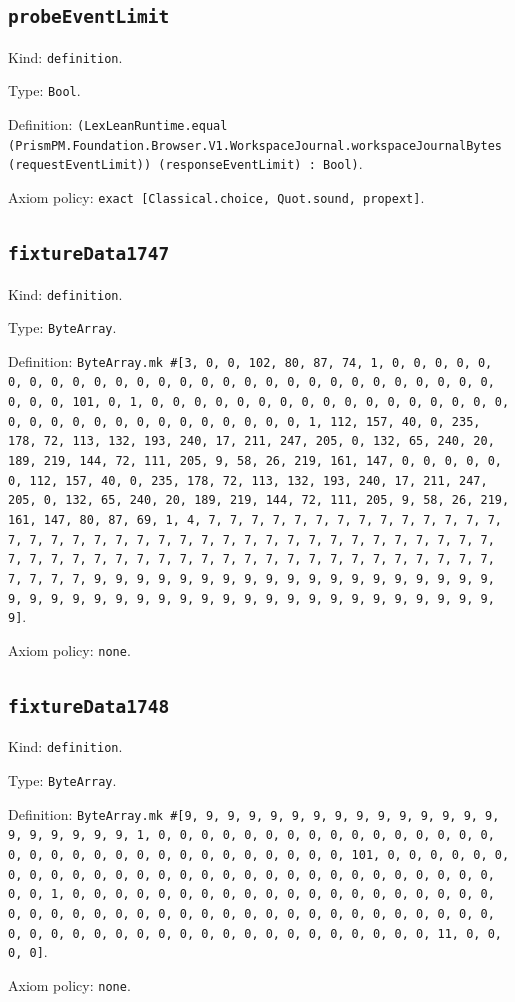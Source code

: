 \documentclass[11pt]{article}
\begin{document}
\subsection*{\texttt{probeEventLimit}}
\noindent Kind: \texttt{definition}.\par
\noindent Type: \texttt{Bool}.\par
\noindent Definition: \texttt{(LexLeanRuntime.equal (PrismPM.Foundation.Browser.V1.WorkspaceJournal.workspaceJournalBytes (requestEventLimit)) (responseEventLimit) : Bool)}.\par
\noindent Axiom policy: \texttt{exact [Classical.choice, Quot.sound, propext]}.\par
\subsection*{\texttt{fixtureData1747}}
\noindent Kind: \texttt{definition}.\par
\noindent Type: \texttt{ByteArray}.\par
\noindent Definition: \texttt{ByteArray.mk \#[3, 0, 0, 102, 80, 87, 74, 1, 0, 0, 0, 0, 0, 0, 0, 0, 0, 0, 0, 0, 0, 0, 0, 0, 0, 0, 0, 0, 0, 0, 0, 0, 0, 0, 0, 0, 0, 0, 0, 101, 0, 1, 0, 0, 0, 0, 0, 0, 0, 0, 0, 0, 0, 0, 0, 0, 0, 0, 0, 0, 0, 0, 0, 0, 0, 0, 0, 0, 0, 0, 0, 0, 0, 1, 112, 157, 40, 0, 235, 178, 72, 113, 132, 193, 240, 17, 211, 247, 205, 0, 132, 65, 240, 20, 189, 219, 144, 72, 111, 205, 9, 58, 26, 219, 161, 147, 0, 0, 0, 0, 0, 0, 112, 157, 40, 0, 235, 178, 72, 113, 132, 193, 240, 17, 211, 247, 205, 0, 132, 65, 240, 20, 189, 219, 144, 72, 111, 205, 9, 58, 26, 219, 161, 147, 80, 87, 69, 1, 4, 7, 7, 7, 7, 7, 7, 7, 7, 7, 7, 7, 7, 7, 7, 7, 7, 7, 7, 7, 7, 7, 7, 7, 7, 7, 7, 7, 7, 7, 7, 7, 7, 7, 7, 7, 7, 7, 7, 7, 7, 7, 7, 7, 7, 7, 7, 7, 7, 7, 7, 7, 7, 7, 7, 7, 7, 7, 7, 7, 7, 7, 7, 7, 7, 9, 9, 9, 9, 9, 9, 9, 9, 9, 9, 9, 9, 9, 9, 9, 9, 9, 9, 9, 9, 9, 9, 9, 9, 9, 9, 9, 9, 9, 9, 9, 9, 9, 9, 9, 9, 9, 9, 9, 9, 9, 9, 9]}.\par
\noindent Axiom policy: \texttt{none}.\par
\subsection*{\texttt{fixtureData1748}}
\noindent Kind: \texttt{definition}.\par
\noindent Type: \texttt{ByteArray}.\par
\noindent Definition: \texttt{ByteArray.mk \#[9, 9, 9, 9, 9, 9, 9, 9, 9, 9, 9, 9, 9, 9, 9, 9, 9, 9, 9, 9, 9, 1, 0, 0, 0, 0, 0, 0, 0, 0, 0, 0, 0, 0, 0, 0, 0, 0, 0, 0, 0, 0, 0, 0, 0, 0, 0, 0, 0, 0, 0, 0, 0, 0, 101, 0, 0, 0, 0, 0, 0, 0, 0, 0, 0, 0, 0, 0, 0, 0, 0, 0, 0, 0, 0, 0, 0, 0, 0, 0, 0, 0, 0, 0, 0, 0, 1, 0, 0, 0, 0, 0, 0, 0, 0, 0, 0, 0, 0, 0, 0, 0, 0, 0, 0, 0, 0, 0, 0, 0, 0, 0, 0, 0, 0, 0, 0, 0, 0, 0, 0, 0, 0, 0, 0, 0, 0, 0, 0, 0, 0, 0, 0, 0, 0, 0, 0, 0, 0, 0, 0, 0, 0, 0, 0, 0, 0, 0, 0, 0, 11, 0, 0, 0, 0]}.\par
\noindent Axiom policy: \texttt{none}.\par
\end{document}
